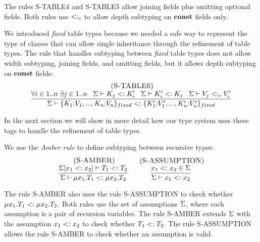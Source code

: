 The rules \textsc{S-TABLE4} and \textsc{S-TABLE5} allow joining fields
plus omitting optional fields.
Both rules use $<:_{c}$ to allow depth subtyping on $\mathbf{const}$ fields only.

We introduced \emph{fixed} table types because we needed a safe way
to represent the type of classes that can allow single inheritance
through the refinement of table types.
The rule that handles subtyping between \emph{fixed} table types
does not allow width subtyping, joining fields, and omitting fields,
but it allows depth subtyping on $\mathbf{const}$ fields:
\[
\begin{array}{c}
\; (\textsc{S-TABLE6})\\
\dfrac{\forall i \in 1..n \; \exists j \in 1..n \;\;\;
       \Sigma \vdash K_{j} <: K_{i}' \;\;\;
       \Sigma \vdash K_{i}' <: K_{j} \;\;\;
       \Sigma \vdash V_{j} <:_{c} V_{i}'}
      {\Sigma \vdash \{K_{1}{:}V_{1}, ..., K_{n}{:}V_{n}\}_{fixed} <:
                    \{K_{1}'{:}V_{1}', ..., K_{n}'{:}V_{n}'\}_{fixed}}
\end{array}
\]

In the next section we will show in more detail how our type system
uses these tags to handle the refinement of table types.

We use the \emph{Amber rule} \citep{cardelli1986amber} to define
subtyping between recursive types:
\[
\begin{array}{c}
\begin{array}{c}
\; (\textsc{S-AMBER})\\
\dfrac{\Sigma[x_{1} <: x_{2}] \vdash T_{1} <: T_{2}}
      {\Sigma \vdash \mu x_{1}.T_{1} <: \mu x_{2}.T_{2}}
\end{array}
\;
\begin{array}{c}
\; (\textsc{S-ASSUMPTION})\\
\dfrac{x_{1} <: x_{2} \in \Sigma}
      {\Sigma \vdash x_{1} <: x_{2}}
\end{array}
\end{array}
\]

The rule \textsc{S-AMBER} also uses the rule \textsc{S-ASSUMPTION}
to check whether $\mu x_{1}.T_{1} <: \mu x_{2}.T_{2}$.
Both rules use the set of assumptions $\Sigma$,
where each assumption is a pair of recursion variables.
The rule \textsc{S-AMBER} extends $\Sigma$ with the assumption
$x_{1} <: x_{2}$ to check whether $T_{1} <: T_{2}$.
The rule \textsc{S-ASSUMPTION} allows the rule \textsc{S-AMBER}
to check whether an assumption is valid.

